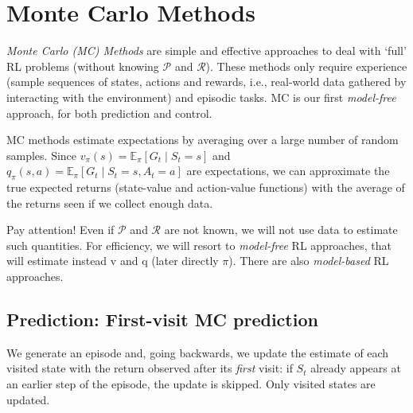 \chapter{Monte Carlo Methods}

\textit{Monte Carlo (MC) Methods} are simple and effective approaches to deal with `full' RL problems (without knowing $\mathcal{P}$ and $\mathcal{R}$). These methods only require experience (sample sequences of states, actions and rewards, i.e., real-world data gathered by interacting with the environment) and episodic tasks. MC is our first \textit{model-free} approach, for both prediction and control.

MC methods estimate expectations by averaging over a large number of random samples. 
Since $v_\pi(s)=\mathbb{E}_\pi[G_t\mid S_t=s]$ and $q_\pi(s,a)=\mathbb{E}_\pi[G_t\mid S_t=s,A_t=a]$ are expectations, we can approximate the true expected returns (state-value and action-value functions) with the average of the returns seen if we collect enough data.

Pay attention! Even if $\mathcal{P}$ and $\mathcal{R}$ are not known, we will not use data to estimate such quantities.
For efficiency, we will resort to \textit{model-free} RL approaches, that will estimate instead $\mathrm{v}$ and $\mathrm{q}$ (later directly $\pi$). There are also \textit{model-based} RL approaches.
\section{Prediction: First-visit MC prediction}
We generate an episode and, going backwards, we update the estimate of each visited state with the return observed after its \emph{first} visit: if $S_t$ already appears at an earlier step of the episode, the update is skipped. Only visited states are updated.

